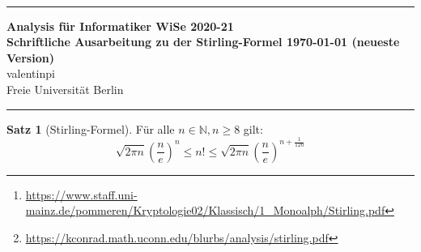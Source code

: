 \documentclass[10pt,fleqn]{article}
\theoremstyle{definition}
\newtheorem{theorem}{Satz}
\theoremstyle{remark}
\newcommand{\Authors}{valentinpi}
\begin{document}
\vspace*{-12ex}
\phantom{}\\
\noindent\rule{\textwidth}{0.1pt}
\large \textbf{Analysis für Informatiker \hfill WiSe 2020-21} \vspace*{0.25cm}\\
\normalsize \textbf{Schriftliche Ausarbeitung zu der Stirling-Formel \hfill \today { (neueste Version)}}\\
\Authors\\
Freie Universität Berlin\\
\noindent\rule{\textwidth}{0.1pt}

\begin{abstract}
    \noindent Ziel dieser Ausarbeitung ist es, die in der Vorlesung unbewiesene Formel von \textsc{Stirling} zu beweisen, und dabei weitgehend die nötigen Hilfsformeln mit unseren bisherigen Kenntnissen selbst herzuleiten. Insbesondere versuchen wir hier ein Verständnis für recht erweiterte Werkzeuge zu entwickeln, trotz dass wir diese nicht beweisen werden. Genutzt wird eine weitere Ausarbeitung der Uni Mainz.\footnote{\url{https://www.staff.uni-mainz.de/pommeren/Kryptologie02/Klassisch/1_Monoalph/Stirling.pdf}}\\
    
    \noindent Die in der Komplexitätsanalyze genutzte Formel von James Stirling hat eine reiche Geschichte. Ein Ansatz hier für Quellen ist das Dokument \emph{Methodus Differentialis} von 1730. In anderen Papern zu diesem Thema kann man aber deutlich mehr erfahren. Wen dies interessiert: Diese\footnote{\url{https://kconrad.math.uconn.edu/blurbs/analysis/stirling.pdf}} Ausarbeitung von Keith Conrad ist sehr empfehlenswert. Etwa hat \textsc{DeMoivre} bei der Entdeckung seinen Anteil gehabt. Ausserdem wird darüber geredet, wie Stirling auf die Rolle der Konstante \(\pi\) in der Formel kam.
\end{abstract}

\begin{theorem}[Stirling-Formel] Für alle \(n \in \mathbb{N}, n \geq 8\) gilt:
    \[
        \sqrt{2 \pi n} \left(\frac{n}{e}\right)^n \leq n! \leq \sqrt{2 \pi n} \left(\frac{n}{e}\right)^{n+\frac{1}{12n}}
    \]
\end{theorem}
\end{document}
